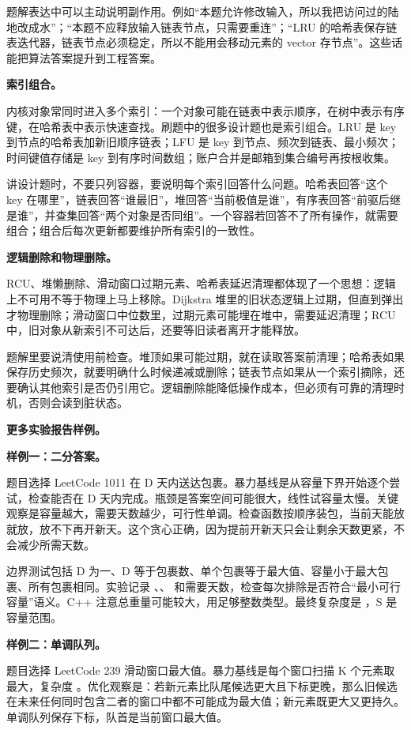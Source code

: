 题解表达中可以主动说明副作用。例如“本题允许修改输入，所以我把访问过的陆地改成水”；“本题不应释放输入链表节点，只需要重连”；“LRU 的哈希表保存链表迭代器，链表节点必须稳定，所以不能用会移动元素的 vector 存节点”。这些话能把算法答案提升到工程答案。

\noindent\textbf{索引组合。}

内核对象常同时进入多个索引：一个对象可能在链表中表示顺序，在树中表示有序键，在哈希表中表示快速查找。刷题中的很多设计题也是索引组合。LRU 是 key 到节点的哈希表加新旧顺序链表；LFU 是 key 到节点、频次到链表、最小频次；时间键值存储是 key 到有序时间数组；账户合并是邮箱到集合编号再按根收集。

讲设计题时，不要只列容器，要说明每个索引回答什么问题。哈希表回答“这个 key 在哪里”，链表回答“谁最旧”，堆回答“当前极值是谁”，有序表回答“前驱后继是谁”，并查集回答“两个对象是否同组”。一个容器若回答不了所有操作，就需要组合；组合后每次更新都要维护所有索引的一致性。

\noindent\textbf{逻辑删除和物理删除。}

RCU、堆懒删除、滑动窗口过期元素、哈希表延迟清理都体现了一个思想：逻辑上不可用不等于物理上马上移除。Dijkstra 堆里的旧状态逻辑上过期，但直到弹出才物理删除；滑动窗口中位数里，过期元素可能埋在堆中，需要延迟清理；RCU 中，旧对象从新索引不可达后，还要等旧读者离开才能释放。

题解里要说清使用前检查。堆顶如果可能过期，就在读取答案前清理；哈希表如果保存历史频次，就要明确什么时候递减或删除；链表节点如果从一个索引摘除，还要确认其他索引是否仍引用它。逻辑删除能降低操作成本，但必须有可靠的清理时机，否则会读到脏状态。

\noindent\textbf{更多实验报告样例。}

\noindent\textbf{样例一：二分答案。}

题目选择 LeetCode 1011 在 D 天内送达包裹。暴力基线是从容量下界开始逐个尝试，检查能否在 D 天内完成。瓶颈是答案空间可能很大，线性试容量太慢。关键观察是容量越大，需要天数越少，可行性单调。检查函数按顺序装包，当前天能放就放，放不下再开新天。这个贪心正确，因为提前开新天只会让剩余天数更紧，不会减少所需天数。

边界测试包括 D 为一、D 等于包裹数、单个包裹等于最大值、容量小于最大包裹、所有包裹相同。实验记录 、、 和需要天数，检查每次排除是否符合“最小可行容量”语义。C++ 注意总重量可能较大，用足够整数类型。最终复杂度是 ，S 是容量范围。

\noindent\textbf{样例二：单调队列。}

题目选择 LeetCode 239 滑动窗口最大值。暴力基线是每个窗口扫描 K 个元素取最大，复杂度 。优化观察是：若新元素比队尾候选更大且下标更晚，那么旧候选在未来任何同时包含二者的窗口中都不可能成为最大值；新元素既更大又更持久。单调队列保存下标，队首是当前窗口最大值。

